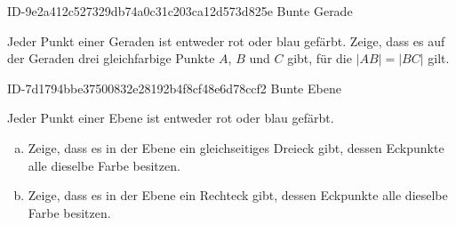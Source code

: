 \begin{exercise}
      {ID-9e2a412c527329db74a0c31c203ca12d573d825e}
      {Bunte Gerade}
  \ifproblem\problem\par
    Jeder Punkt einer Geraden ist entweder rot
    oder blau gefärbt. Zeige, dass es auf der
    Geraden drei gleichfarbige Punkte $A$,
    $B$ und $C$ gibt, für die $|AB|=|BC|$ gilt.
  \fi
\end{exercise}

\begin{exercise}
      {ID-7d1794bbe37500832e28192b4f8cf48e6d78ccf2}
      {Bunte Ebene}
  \ifproblem\problem\par
    Jeder Punkt einer Ebene ist entweder rot oder
    blau gefärbt.
    \begin{enumerate}[a)]
      \item Zeige, dass es in der Ebene ein
            gleichseitiges Dreieck gibt, dessen
            Eckpunkte alle dieselbe Farbe besitzen.
      \item Zeige, dass es in der Ebene ein
            Rechteck gibt, dessen Eckpunkte alle
            dieselbe Farbe besitzen.
    \end{enumerate}
  \fi
\end{exercise}

